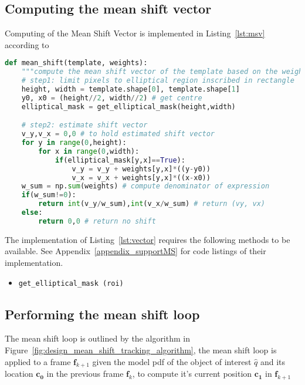 \subsection{Computing the mean shift vector}
Computing of the Mean Shift Vector is implemented in Listing~\ref{lst:msv}
according to %

\begin{lstlisting}[language=Python, caption={Function computing the mean shift vector}, captionpos=b, label={lst:msv}]
def mean_shift(template, weights):
    """compute the mean shift vector of the template based on the weights"""
    # step1: limit pixels to elliptical region inscribed in rectangle
    height, width = template.shape[0], template.shape[1]
    y0, x0 = (height//2, width//2) # get centre 
    elliptical_mask = get_elliptical_mask(height,width)

    # step2: estimate shift vector
    v_y,v_x = 0,0 # to hold estimated shift vector
    for y in range(0,height):
        for x in range(0,width): 
            if(elliptical_mask[y,x]==True):
                v_y = v_y + weights[y,x]*((y-y0)) 
                v_x = v_x + weights[y,x]*((x-x0))
    w_sum = np.sum(weights) # compute denominator of expression
    if(w_sum!=0):
        return int(v_y/w_sum),int(v_x/w_sum) # return (vy, vx)
    else:
        return 0,0 # return no shift
\end{lstlisting}

The implementation of Listing~\ref{lst:vector} requires the following methods to
be available. See Appendix~\ref{appendix_supportMS} for code listings of their implementation. 
\begin{itemize}
    \item \lstinline{get_elliptical_mask (roi)}
\end{itemize}

\subsection{Performing the mean shift loop}
The mean shift loop is outlined by the algorithm in
Figure~\ref{fig:design_mean_shift_tracking_algorithm}, the mean shift loop is
applied to a frame $\mathbf{f}_{k+1}$ given the model pdf of the object of
interest $\hat{q}$ and its location $\mathbf{c_0}$ in the previous frame
$\mathbf{f}_{k}$, to compute it's current position $\mathbf{c_1}$ in
$\mathbf{f}_{k+1}$

